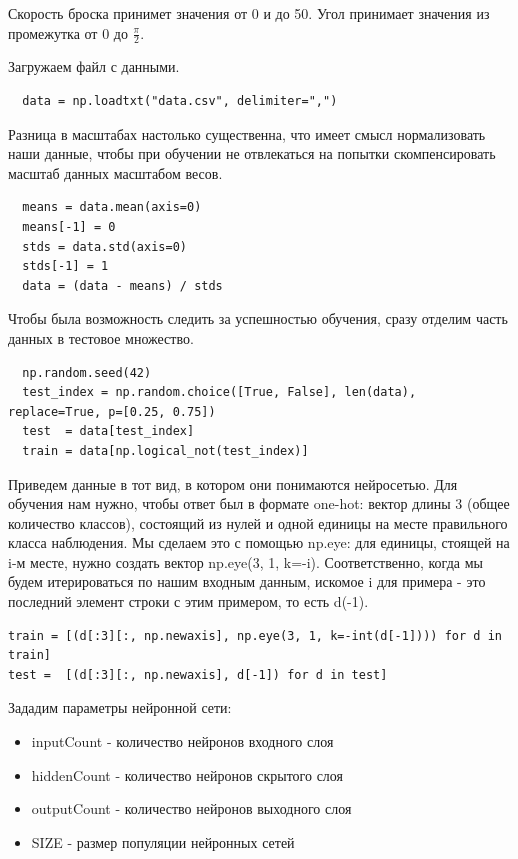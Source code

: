 Скорость броска принимет значения от 0 и до 50. Угол принимает значения из промежутка от 0 до $\frac{\pi}{2}$. 

Загружаем файл с данными.

\begin{lstlisting}
  data = np.loadtxt("data.csv", delimiter=",")
\end{lstlisting}

Разница в масштабах настолько существенна, что имеет смысл нормализовать наши данные, чтобы при обучении не отвлекаться на попытки скомпенсировать масштаб данных масштабом весов.

\begin{lstlisting}
  means = data.mean(axis=0)
  means[-1] = 0 
  stds = data.std(axis=0)
  stds[-1] = 1
  data = (data - means) / stds
\end{lstlisting}

Чтобы была возможность следить за успешностью обучения, сразу отделим часть данных в тестовое множество.

\begin{lstlisting}
  np.random.seed(42)
  test_index = np.random.choice([True, False], len(data), replace=True, p=[0.25, 0.75])
  test  = data[test_index]
  train = data[np.logical_not(test_index)]
\end{lstlisting}

Приведем  данные в тот вид, в котором они понимаются нейросетью. Для обучения нам нужно, чтобы ответ был в формате one-hot: вектор длины 3 (общее количество классов), состоящий из нулей и одной единицы на месте правильного класса наблюдения. Мы сделаем это с помощью np.eye: для единицы, стоящей на i-м месте, нужно создать вектор np.eye(3, 1, k=-i). Соответственно, когда мы будем итерироваться по нашим входным данным, искомое i для примера - это последний элемент строки с этим примером, то есть d(-1). 

\begin{lstlisting}
train = [(d[:3][:, np.newaxis], np.eye(3, 1, k=-int(d[-1]))) for d in train]  
test =  [(d[:3][:, np.newaxis], d[-1]) for d in test]
\end{lstlisting}

Зададим параметры нейронной сети:
\begin{itemize}
  \item inputCount - количество нейронов входного слоя
  \item hiddenCount - количество нейронов скрытого слоя
  \item outputCount - количество нейронов выходного слоя
  \item SIZE - размер популяции нейронных сетей
\end{itemize}

